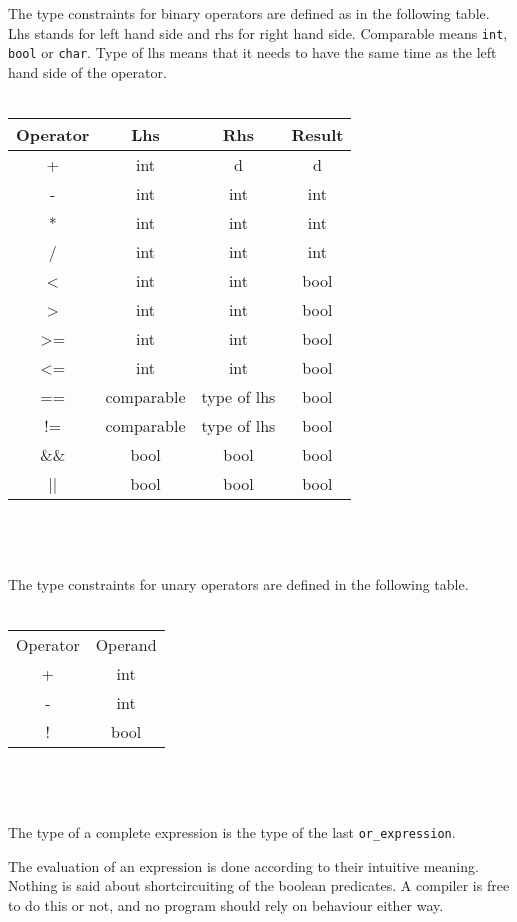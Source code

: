 \documentclass{report}
\begin{document}
The type constraints for binary operators are defined as in the
following table. Lhs stands for left hand side and rhs for right
hand side. Comparable means \texttt{int}, \texttt{bool} or
\texttt{char}. Type of lhs means that it needs to have
the same time as the left hand side of the operator.\\
\\
\begin{tabular}{|c|c|c|c|}
  \hline
  Operator & Lhs & Rhs & Result \\
  \hline
  +  & int & d & d \\
  -  & int & int & int \\
  *  & int & int & int \\
  /  & int & int & int \\
  <  & int & int & bool \\
  >  & int & int& bool \\
  >= & int & int & bool \\
  <= & int & int & bool \\
  == & comparable & type of lhs & bool \\
  != & comparable & type of lhs & bool \\
  \&\& & bool & bool & bool \\
  || & bool & bool & bool \\
  \hline
\end{tabular}\\
\\
\\
The type constraints for unary operators are defined in the following table.\\
\\
\begin{tabular}{|c|c|}
    \hline
    Operator & Operand \\
    + & int \\
    - & int \\
    ! & bool \\
    \hline
 \end{tabular}\\
\\
\\
The type of a complete expression is the type of the last \texttt{or\_expression}.

The evaluation of an expression is done according to their intuitive
meaning. Nothing is said about shortcircuiting of the boolean
predicates. A compiler is free to do this or not, and no program
should rely on behaviour either way.
\end{document}
